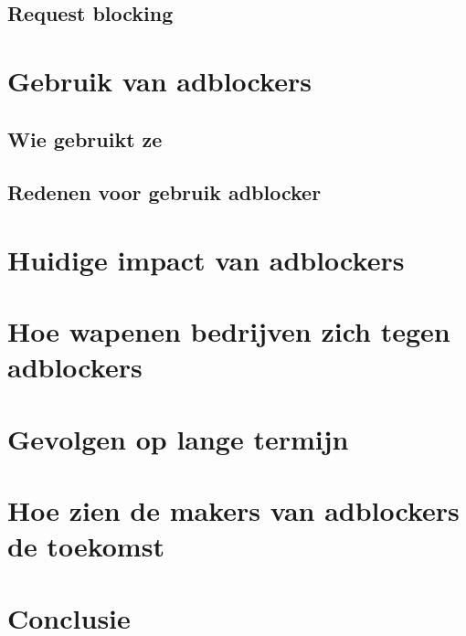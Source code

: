 \documentclass[pdftex,a4paper,12pt,twoside]{report}
\begin{document}
\section{Request blocking}
\label{sec:Request blocking}

\chapter{Gebruik van adblockers}
\label{ch:Gebruik van adblockers}
\section{Wie gebruikt ze}
\label{sec:Wie gebruikt ze}
\section{Redenen voor gebruik adblocker}
\label{sec:Redenen voor gebruik adblocker}
\chapter{Huidige impact van adblockers}
\label{ch:Huidige impact van adblockers}
\chapter{Hoe wapenen bedrijven zich tegen adblockers}
\label{ch:Hoe wapenen bedrijven zich tegen adblockers}
\chapter{Gevolgen op lange termijn}
\label{ch:Gevolgen op lange termijn}
\chapter{Hoe zien de makers van adblockers de toekomst}
\label{ch:Hoe zien de makers van adblockers de toekomst}

\chapter{Conclusie}
\label{ch:conclusie}








\listoffigures
\listoftables
\end{document}
